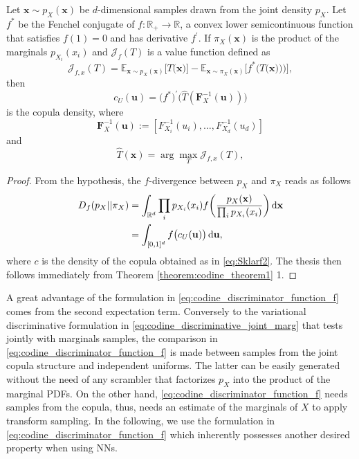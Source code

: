 \begin{corollary}
\label{cor:codine_cor1}
Let $\mathbf{x} \sim p_X(\mathbf{x})$ be $d$-dimensional samples drawn from the joint density $p_X$. Let $f^*$ be the Fenchel conjugate of $f:\mathbb{R}_+ \to \mathbb{R}$, a convex lower semicontinuous function that satisfies $f(1)=0$ and has derivative $f^{\prime}$. If $\pi_X(\mathbf{x})$ is the product of the marginals $p_{X_i}(x_i)$ and $\mathcal{J}_{f}(T)$ is a value function defined as 
\begin{equation}
\label{eq:codine_discriminative_joint_marg}
\mathcal{J}_{f,x}(T) = \mathbb{E}_{\mathbf{x} \sim p_{X}(\mathbf{x})}\biggl[T\bigl(\mathbf{x}\bigr)\biggr] -\mathbb{E}_{\mathbf{x} \sim \pi_{X}(\mathbf{x})}\biggl[f^*\biggl(T\bigl(\mathbf{x})\bigr)\biggr)\biggr],
\end{equation}
then
\begin{equation}
c_U(\mathbf{u}) = \bigl(f^{*}\bigr)^{\prime} \bigl(\hat{T}(\mathbf{F}_X^{-1}(\mathbf{u}))\bigr)
\end{equation}
is the copula density, where
\begin{equation}
\mathbf{F}_X^{-1}(\mathbf{u}) := [F_{X_i}^{-1}(u_i),\dots,F_{X_d}^{-1}(u_d)]
\end{equation}
and
\begin{equation}
\hat{T}(\mathbf{x}) = \arg \max_T \mathcal{J}_{f,x}(T),
\end{equation}
\end{corollary}
 
\begin{proof}
From the hypothesis, the $f$-divergence between $p_X$ and $\pi_X$ reads as follows
\begin{align}
D_f(p_X||\pi_X) & = \int_{\mathbb{R}^d}{\prod_{i}{p_{X_i}(x_i)}f\biggl(\frac{p_X(\mathbf{x})}{\prod_{i}{p_{X_i}(x_i)}}\biggr)\mathop{}\!\mathrm{d} \mathbf{x}} \nonumber \\
& = \int_{[0,1]^d}{f\bigl(c_U(\mathbf{u})\bigr)\mathop{}\!\mathrm{d} \mathbf{u}},
\end{align}
where $c$ is the density of the copula obtained as in \eqref{eq:Sklarf2}. The thesis then follows immediately from Theorem \ref{theorem:codine_theorem1} 1.
\end{proof}

A great advantage of the formulation in \eqref{eq:codine_discriminator_function_f} comes from the second expectation term. Conversely to the variational discriminative formulation in \eqref{eq:codine_discriminative_joint_marg} that tests jointly with marginals samples, the comparison in \eqref{eq:codine_discriminator_function_f} is made between samples from the joint copula structure and independent uniforms. The latter can be easily generated without the need of any scrambler that factorizes $p_X$ into the product of the marginal PDFs. On the other hand, \eqref{eq:codine_discriminator_function_f} needs samples from the copula, thus, needs an estimate of the marginals of $X$ to apply transform sampling. In the following, we use the formulation in \eqref{eq:codine_discriminator_function_f} which inherently possesses another desired property when using NNs.

